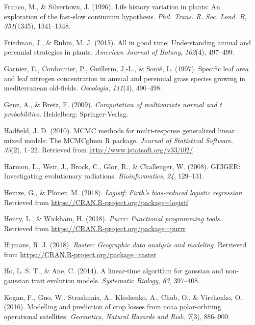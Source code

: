 \documentclass[man,floatsintext]{apa6}
\theoremstyle{definition}
\theoremstyle{definition}
\theoremstyle{definition}
\theoremstyle{remark}
\begin{document}
\leavevmode\hypertarget{ref-franco1996life}{}%
Franco, M., \& Silvertown, J. (1996). Life history variation in plants:
An exploration of the fast-slow continuum hypothesis. \emph{Phil. Trans.
R. Soc. Lond. B}, \emph{351}(1345), 1341--1348.

\leavevmode\hypertarget{ref-friedman2015all}{}%
Friedman, J., \& Rubin, M. J. (2015). All in good time: Understanding
annual and perennial strategies in plants. \emph{American Journal of
Botany}, \emph{102}(4), 497--499.

\leavevmode\hypertarget{ref-garnier1997specific}{}%
Garnier, E., Cordonnier, P., Guillerm, J.-L., \& Sonié, L. (1997).
Specific leaf area and leaf nitrogen concentration in annual and
perennial grass species growing in mediterranean old-fields.
\emph{Oecologia}, \emph{111}(4), 490--498.

\leavevmode\hypertarget{ref-R-mvtnorm}{}%
Genz, A., \& Bretz, F. (2009). \emph{Computation of multivariate normal
and t probabilities}. Heidelberg: Springer-Verlag.

\leavevmode\hypertarget{ref-R-MCMCglmm}{}%
Hadfield, J. D. (2010). MCMC methods for multi-response generalized
linear mixed models: The MCMCglmm R package. \emph{Journal of
Statistical Software}, \emph{33}(2), 1--22. Retrieved from
\url{http://www.jstatsoft.org/v33/i02/}

\leavevmode\hypertarget{ref-R-geiger_d}{}%
Harmon, L., Weir, J., Brock, C., Glor, R., \& Challenger, W. (2008).
GEIGER: Investigating evolutionary radiations. \emph{Bioinformatics},
\emph{24}, 129--131.

\leavevmode\hypertarget{ref-R-logistf}{}%
Heinze, G., \& Ploner, M. (2018). \emph{Logistf: Firth's bias-reduced
logistic regression}. Retrieved from
\url{https://CRAN.R-project.org/package=logistf}

\leavevmode\hypertarget{ref-R-purrr}{}%
Henry, L., \& Wickham, H. (2018). \emph{Purrr: Functional programming
tools}. Retrieved from \url{https://CRAN.R-project.org/package=purrr}

\leavevmode\hypertarget{ref-R-raster}{}%
Hijmans, R. J. (2018). \emph{Raster: Geographic data analysis and
modeling}. Retrieved from
\url{https://CRAN.R-project.org/package=raster}

\leavevmode\hypertarget{ref-R-phylolm}{}%
Ho, L. S. T., \& Ane, C. (2014). A linear-time algorithm for gaussian
and non-gaussian trait evolution models. \emph{Systematic Biology},
\emph{63}, 397--408.

\leavevmode\hypertarget{ref-kogan2016modelling}{}%
Kogan, F., Guo, W., Strashnaia, A., Kleshenko, A., Chub, O., \&
Virchenko, O. (2016). Modelling and prediction of crop losses from noaa
polar-orbiting operational satellites. \emph{Geomatics, Natural Hazards
and Risk}, \emph{7}(3), 886--900.
\end{document}
